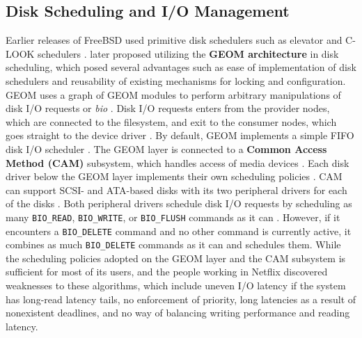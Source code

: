 \subsection{Disk Scheduling and I/O Management} \label{disk-scheduling-io} %

Earlier releases of FreeBSD used primitive disk schedulers such as elevator and C-LOOK schedulers \parencite{rizzo2009}.
\textcite{rizzo2009} later proposed utilizing the \textbf{GEOM architecture} in disk scheduling, which posed several advantages
such as ease of implementation of disk schedulers and reusability of existing mechanisms for locking and configuration.
GEOM uses a graph of GEOM modules to perform arbitrary manipulations of disk I/O requests or \textit{bio} \parencite{rizzo2009}. Disk I/O
requests enters from the provider nodes, which are connected to the filesystem, and exit to the consumer nodes, which
goes straight to the device driver \parencite{rizzo2009}. By default, GEOM implements a simple FIFO disk I/O scheduler
\parencite{losh2015}. The GEOM layer is connected to a \textbf{Common Access Method (CAM)} subsystem, which handles access of
media devices \parencite{losh2015}. Each disk driver below the GEOM layer implements their own scheduling policies
\parencite{losh2015}. CAM can support SCSI- and ATA-based disks with its two peripheral drivers for each of the disks
\parencite{losh2015}. Both peripheral drivers schedule disk I/O requests by scheduling as many \texttt{BIO\_READ}, \texttt{BIO\_WRITE},
or \texttt{BIO\_FLUSH} commands as it can \parencite{losh2015}. However, if it encounters a \texttt{BIO\_DELETE} command
and no other command is currently active, it combines as much \texttt{BIO\_DELETE} commands as it can and schedules them.
While the scheduling policies adopted on the GEOM layer and the CAM subsystem is sufficient for most of its users,
\textcite{losh2015} and the people working in Netflix discovered weaknesses to these algorithms, which include uneven I/O latency
if the system has long-read latency tails, no enforcement of priority, long latencies as a result of nonexistent deadlines,
and no way of balancing writing performance and reading latency.

